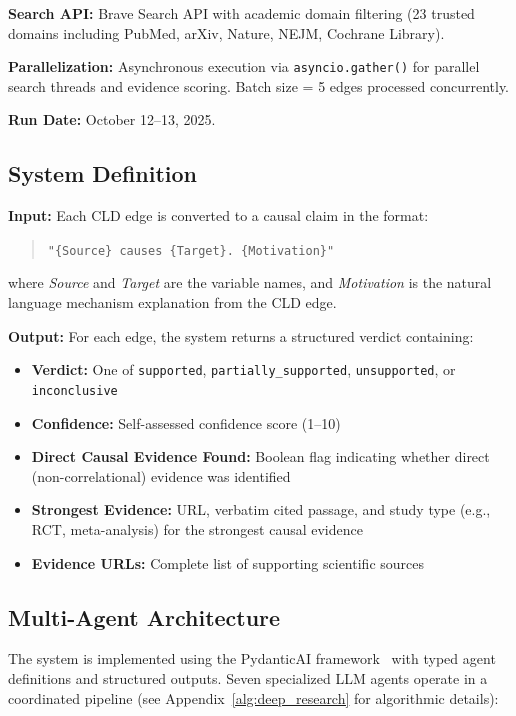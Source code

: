\textbf{Search API:} Brave Search API with academic domain filtering (23 trusted domains including PubMed, arXiv, Nature, NEJM, Cochrane Library).

\textbf{Parallelization:} Asynchronous execution via \texttt{asyncio.gather()} for parallel search threads and evidence scoring. Batch size = 5 edges processed concurrently.

\textbf{Run Date:} October 12--13, 2025.

\subsection{System Definition}

\textbf{Input:} Each CLD edge is converted to a causal claim in the format:
\begin{quote}
\texttt{"\{Source\} causes \{Target\}. \{Motivation\}"}
\end{quote}
where \textit{Source} and \textit{Target} are the variable names, and \textit{Motivation} is the natural language mechanism explanation from the CLD edge.

\textbf{Output:} For each edge, the system returns a structured verdict containing:
\begin{itemize}[noitemsep]
    \item \textbf{Verdict:} One of \texttt{supported}, \texttt{partially\_supported}, \texttt{unsupported}, or \texttt{inconclusive}
    \item \textbf{Confidence:} Self-assessed confidence score (1--10)
    \item \textbf{Direct Causal Evidence Found:} Boolean flag indicating whether direct (non-correlational) evidence was identified
    \item \textbf{Strongest Evidence:} URL, verbatim cited passage, and study type (e.g., RCT, meta-analysis) for the strongest causal evidence
    \item \textbf{Evidence URLs:} Complete list of supporting scientific sources
\end{itemize}

\subsection{Multi-Agent Architecture}

The system is implemented using the PydanticAI framework~\cite{pydanticai2024} with typed agent definitions and structured outputs. Seven specialized LLM agents operate in a coordinated pipeline (see Appendix~\ref{alg:deep_research} for algorithmic details):

